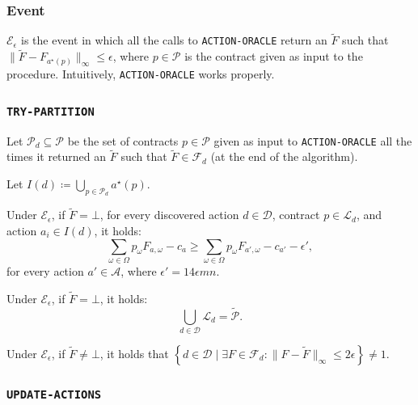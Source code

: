 \subsubsection*{Event}

$\mathcal{E}_\epsilon$ is the event in which all the calls to \texttt{ACTION-ORACLE} return an $\tilde F$ such that $ \|\widetilde{F} - F_{a^\star(p)} \|_{\infty} \le \epsilon $, where $p \in \mathcal{P}$ is the contract given as input to the procedure.
%
Intuitively, \texttt{ACTION-ORACLE} works properly.

\subsubsection*{\texttt{TRY-PARTITION}}

Let $\mathcal{P}_d \subseteq \mathcal{P}$ be the set of contracts $p \in \mathcal{P}$ given as input to \texttt{ACTION-ORACLE} all the times it returned an $\tilde F$ such that $\tilde F \in \mathcal{F}_d$ (at the end of the algorithm).


Let $I(d) \coloneqq \bigcup_{p \in \mathcal{P}_d} a^\star(p)$.

\begin{lemma}
	Under $\mathcal{E}_\epsilon$, if $\tilde F = \bot$, for every discovered action $d \in \mathcal{D}$, contract $p \in \mathcal{L}_{d}$, and action $a_i \in I(d)$, it holds:
	\begin{equation*}
	\sum_{\omega \in \Omega } p_{\omega}F_{a, \omega} - c_{a} \ge
	\sum_{\omega \in \Omega } p_{\omega}F_{a', \omega} - c_{a'} -  \epsilon',
	\end{equation*}
	for every action $a' \in \mathcal{A}$, where $\epsilon' = 14 \epsilon m n$.
\end{lemma}

\begin{lemma}
	Under $\mathcal{E}_\epsilon$, if $\tilde F = \bot$, it holds:
	\[
		\bigcup_{d \in \mathcal{D}} \mathcal{L}_d = \widetilde{\mathcal{P}}.
	\]
\end{lemma}


\begin{lemma}
	Under $\mathcal{E}_\epsilon$, if $\tilde F \neq \bot$, it holds that $\left\{ d \in \mathcal{D} \mid \exists F \in \mathcal{F}_d :  \|{F} - \widetilde{F} \|_{\infty} \le 2\epsilon \right\} \neq 1$.
\end{lemma}


\subsubsection*{\texttt{UPDATE-ACTIONS}}

